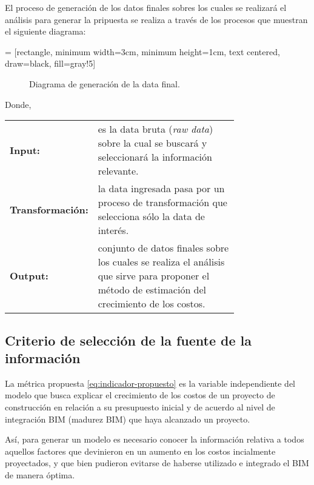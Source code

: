 El proceso de generación de los datos finales sobres los cuales se realizará el análisis para generar la pripuesta se realiza a través de los procesos que muestran el siguiente diagrama:

 = [rectangle, minimum width=3cm, minimum height=1cm, text centered, draw=black, fill=gray!5]

\begin{figure}[H]
    \centering
    \caption{Diagrama de generación de la data final.}
    \label{fig:data-final}
\end{figure}

\noindent
Donde,

\begin{table}[H]
    \begin{tabular}{l p{0.754\linewidth}}
        \textbf{Input:}          & es la data bruta (\emph{raw data}) sobre la cual se buscará y seleccionará la información relevante.\\
        \textbf{Transformación:} & la data ingresada pasa por un proceso de transformación que selecciona sólo la data de interés.\\
        \textbf{Output:}         & conjunto de datos finales sobre los cuales se realiza el análisis que sirve para proponer el método de estimación del crecimiento de los costos.
    \end{tabular}
\end{table}


\subsection{Criterio de selección de la fuente de la información}

La métrica propuesta \eqref{eq:indicador-propuesto} es la variable independiente del modelo que busca explicar el crecimiento de los costos de un proyecto de construcción en relación a su presupuesto inicial y de acuerdo al nivel de integración BIM (madurez BIM) que haya alcanzado un proyecto. 

Así, para generar un modelo es necesario conocer la información relativa a todos aquellos factores que devinieron en un aumento en los costos incialmente proyectados, y que bien pudieron evitarse de haberse utilizado e integrado el BIM de manera óptima.


